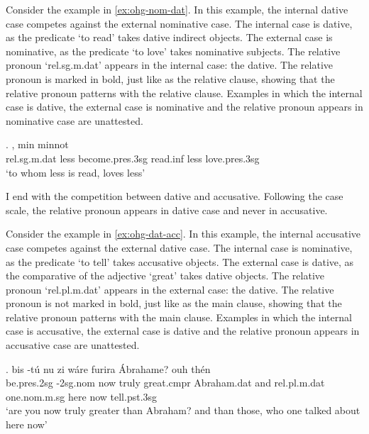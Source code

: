 Consider the example in \ref{ex:ohg-nom-dat}. In this example, the internal dative case competes against the external nominative case.
The internal case is dative, as the predicate  `to read' takes dative indirect objects.
The external case is nominative, as the predicate  `to love' takes nominative subjects.
The relative pronoun  `\ac{rel}.\ac{sg}.\ac{m}.\ac{dat}' appears in the internal case: the dative. The relative pronoun is marked in bold, just like as the relative clause, showing that the relative pronoun patterns with the relative clause.
Examples in which the internal case is dative, the external case is nominative and the relative pronoun appears in nominative case are unattested.

\exg.    , min minnot\\
\ac{rel}.\ac{sg}.\ac{m}.\ac{dat} less become.\ac{pres}.3\ac{sg} read.\ac{inf}\scsub{[dat]} less love.\ac{pres}.3\ac{sg}\scsub{[nom]}\\
`to whom less is read, loves less' \label{ex:ohg-nom-dat}

I end with the competition between dative and accusative. Following the case scale, the relative pronoun appears in dative case and never in accusative.

Consider the example in \ref{ex:ohg-dat-acc}. In this example, the internal accusative case competes against the external dative case.
The internal case is nominative, as the predicate  `to tell' takes accusative objects.
The external case is dative, as the comparative of the adjective  `great' takes dative objects.
The relative pronoun  `\ac{rel}.\ac{pl}.\ac{m}.\ac{dat}' appears in the external case: the dative. The relative pronoun is not marked in bold, just like as the main clause, showing that the relative pronoun patterns with the main clause.
Examples in which the internal case is accusative, the external case is dative and the relative pronoun appears in accusative case are unattested.

\exg. bis -tú nu {zi wáre} furira Ábrahame? ouh thén    \\
be.\ac{pres}.2\ac{sg} -2\ac{sg}.\ac{nom} now truly {great}.\ac{cmpr}\scsub{[dat]} Abraham.\ac{dat} and \ac{rel}.\ac{pl}.\ac{m}.\ac{dat} one.\ac{nom}.\ac{m}.\ac{sg} here now tell.\ac{pst}.3\ac{sg}\scsub{[acc]}\\
`are you now truly greater than Abraham? and than those, who one talked about here now' \label{ex:ohg-dat-acc}

